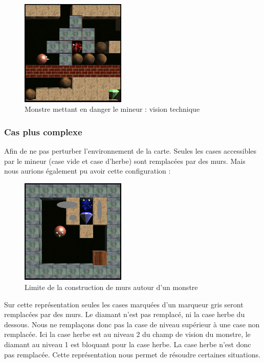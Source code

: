 \documentclass[a4paper,11pt]{article}
\begin{document}
		\begin{figure}[h]
			\center
			\includegraphics[width=5cm]{monstre2}
			\caption{\label{monstre2} Monstre mettant en danger le mineur : vision technique }
		\end{figure}
		
		\subsubsection{Cas plus complexe}
		
Afin de ne pas perturber l'environnement de la carte. Seules les cases accessibles par le mineur (case vide et case d'herbe) sont remplac\'ees par des murs.
Mais nous aurions \'egalement pu avoir cette configuration :
	
		\begin{figure}[h]
			\center
			\includegraphics[width=5cm]{situation1}
			\caption{\label{monstre3} Limite de la construction de murs autour d'un monstre }
		\end{figure}
		
Sur cette repr\'esentation seules les cases marqu\'ees d'un marqueur gris seront remplac\'ees par des murs. Le diamant n'est pas remplac\'e, ni la case herbe du dessous. Nous ne remplaçons donc pas la case de niveau sup\'erieur \`a une case non remplac\'ee. Ici la case herbe est au niveau 2 du champ de vision du monstre, le diamant au niveau 1 est bloquant pour la case herbe. La case herbe n'est donc pas remplac\'ee.
Cette repr\'esentation nous permet de r\'esoudre certaines situations.
	
\end{document}
